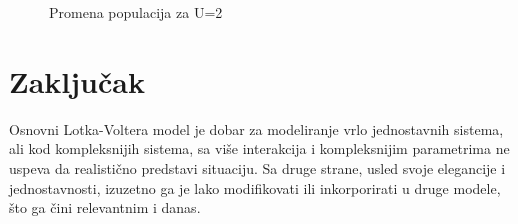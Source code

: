 \documentclass[a4paper]{article}
\begin{document}
\begin{figure}[H]
\begin{minipage}{0.45\textwidth}
        \caption{Promena populacija za U=2}
    \end{minipage}
\end{figure}

\section{Zaključak}
\label{sec:zakljucak}

Osnovni Lotka-Voltera model je dobar za modeliranje vrlo jednostavnih sistema,
ali kod kompleksnijih sistema, sa više interakcija i kompleksnijim parametrima ne uspeva
da realistično predstavi situaciju. Sa druge strane, usled svoje elegancije i jednostavnosti,
izuzetno ga je lako modifikovati ili inkorporirati u druge modele, što ga čini relevantnim i danas.
\end{document}
